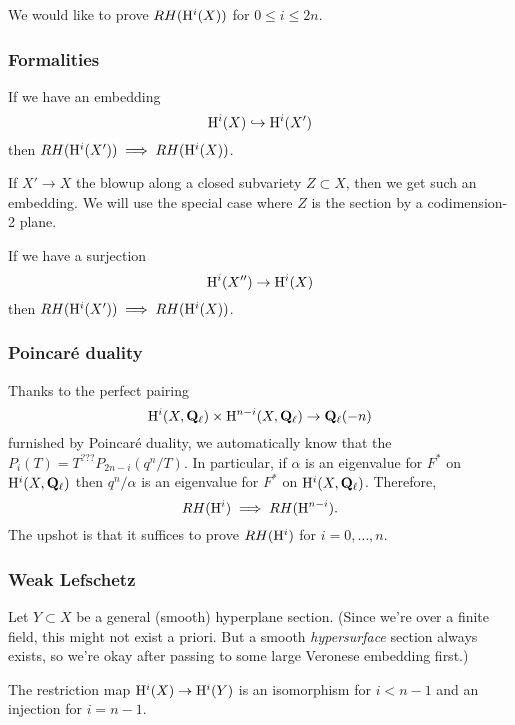  We would like to prove $RH(\mathrm{H}^i(X))$ for $0 \leq i \leq 2n$. 

\subsubsection{Formalities}

If we have an embedding 
\[
\mathrm{H}^i(X) \hookrightarrow \mathrm{H}^i(X')
\]
then $RH(\mathrm{H}^i(X')) \implies RH(\mathrm{H}^i(X))$. 

\begin{ex}
If $X' \rightarrow X$ the blowup along a closed subvariety $Z \subset X$, then we get such an embedding. We will use the special case where $Z$ is the section by a codimension-2 plane. 
\end{ex}

If we have a surjection
\[
\mathrm{H}^i(X'') \rightarrow \mathrm{H}^i(X)
\]
then $RH(\mathrm{H}^i(X')) \implies RH(\mathrm{H}^i(X))$. 

\subsubsection{Poincar\'{e} duality}

Thanks to the perfect pairing 
\[
\mathrm{H}^i(X, \mathbf{Q}_{\ell}) \times \mathrm{H}^{n-i}(X, \mathbf{Q}_{\ell}) \rightarrow \mathbf{Q}_{\ell}(-n)
\]
furnished by Poincar\'{e} duality, we automatically know that the $P_i(T) = T^{???}P_{2n-i}(q^n/T)$. In particular, if $\alpha$ is an eigenvalue for $F^*$ on $\mathrm{H}^i(X, \mathbf{Q}_{\ell})$ then $q^n/\alpha$ is an eigenvalue for $F^*$ on $\mathrm{H}^i(X, \mathbf{Q}_{\ell})$. Therefore, 
\[
RH(\mathrm{H}^i) \implies RH(\mathrm{H}^{n-i}).
\]
The upshot is that it suffices to prove $RH(\mathrm{H}^i)$ for $i = 0, \ldots, n$. 

\subsubsection{Weak Lefschetz}

Let $Y \subset X$ be a general (smooth) hyperplane section. (Since we're over a finite field, this might not exist a priori. But a smooth \emph{hypersurface} section always exists, so we're okay after passing to some large Veronese embedding first.) 

\begin{thm}
The restriction map $\mathrm{H}^i(X) \rightarrow \mathrm{H}^i(Y)$ is an isomorphism for $i < n-1$ and an injection for $i=n-1$. 
\end{thm}

